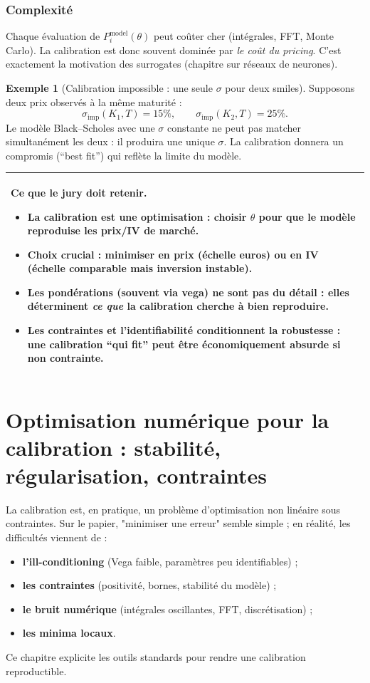 \documentclass[11pt,a4paper]{report}
\newcommand{\1}{\mathbbm{1}}
\theoremstyle{definition}
\newtheorem{example}{Exemple}[chapter]
\theoremstyle{plain}
\theoremstyle{remark}
\newenvironment{jurybox}{%
  \begin{center}
  \setlength{\tabcolsep}{6pt}%
  \renewcommand{\arraystretch}{1.1}%
  \begin{tabular}{|p{0.94\textwidth}|}
  \hline
  \small\textbf{Ce que le jury doit retenir.}\par\medskip
}{%
  \\ \hline
  \end{tabular}
  \end{center}
}
\begin{document}
\subsection{Complexité}
Chaque évaluation de $P_i^{\mathrm{model}}(\theta)$ peut coûter cher (intégrales, FFT, Monte Carlo).
La calibration est donc souvent dominée par \emph{le coût du pricing}.
C'est exactement la motivation des surrogates (chapitre sur réseaux de neurones).

\begin{example}[Calibration impossible : une seule $\sigma$ pour deux smiles]
Supposons deux prix observés à la même maturité :
\[
\sigma_{\mathrm{imp}}(K_1,T)=15\%,\qquad \sigma_{\mathrm{imp}}(K_2,T)=25\%.
\]
Le modèle Black--Scholes avec une $\sigma$ constante ne peut pas matcher simultanément les deux : il produira une unique $\sigma$.
La calibration donnera un compromis (``best fit'') qui reflète la limite du modèle.
\end{example}

\begin{jurybox}
\begin{itemize}
\item La calibration est une optimisation : choisir $\theta$ pour que le modèle reproduise les prix/IV de marché.
\item Choix crucial : minimiser en prix (échelle euros) ou en IV (échelle comparable mais inversion instable).
\item Les pondérations (souvent via vega) ne sont pas du détail : elles déterminent \emph{ce que} la calibration cherche à bien reproduire.
\item Les contraintes et l'identifiabilité conditionnent la robustesse : une calibration ``qui fit'' peut être économiquement absurde si non contrainte.
\end{itemize}
\end{jurybox}

\chapter{Optimisation numérique pour la calibration : stabilité, régularisation, contraintes}
\label{chap:opt_calib}

La calibration est, en pratique, un problème d'optimisation non linéaire sous contraintes.
Sur le papier, "minimiser une erreur" semble simple ; en réalité, les difficultés viennent de :
\begin{itemize}
  \item \textbf{l'ill-conditioning} (Vega faible, paramètres peu identifiables) ;
  \item \textbf{les contraintes} (positivité, bornes, stabilité du modèle) ;
  \item \textbf{le bruit numérique} (intégrales oscillantes, FFT, discrétisation) ;
  \item \textbf{les minima locaux}.
\end{itemize}
Ce chapitre explicite les outils standards pour rendre une calibration reproductible.
\end{document}
